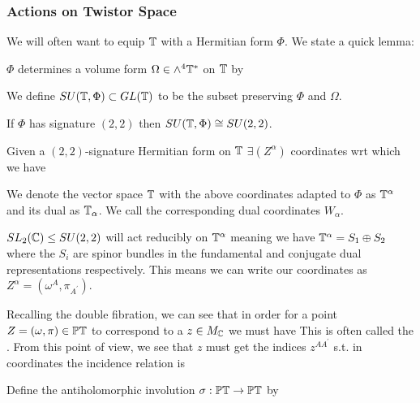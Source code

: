 \documentclass{article}
\begin{document}
\subsubsection{Actions on Twistor Space}
We will often want to equip $\mathbb{T}$ with a Hermitian form $\Phi$. We state a quick lemma:
\begin{lemma}
	$\Phi$ determines a volume form $\Omega \in \wedge^4 \mathbb{T}^\ast$ on $\mathbb{T}$ by 
	\eq{
\Omega = \image \Phi \wedge \image \Phi 
}
\end{lemma}
\begin{definition}
	We define $SU(\mathbb{T},\Phi) \subset GL(\mathbb{T})$ to be the subset preserving $\Phi$ and $\Omega$.  
\end{definition}
\begin{example}
	If $\Phi$ has signature $(2,2)$ then $SU(\mathbb{T},\Phi) \cong SU(2,2)$. 
\end{example}
Given a $(2,2)$-signature Hermitian form on $\mathbb{T}$ $\exists(Z^\alpha)$ coordinates wrt which we have 
\begin{notation}
	We denote the vector space $\mathbb{T}$ with the above coordinates adapted to $\Phi$ as $\mathbb{T}^\alpha$ and its dual as $\mathbb{T}_\alpha$. We call the corresponding dual coordinates $W_\alpha$. 
\end{notation}
$SL_2(\mathbb{C}) \leq SU(2,2)$ will act reducibly on $\mathbb{T}^\alpha$ meaning we have $\mathbb{T}^\alpha = S_1 \oplus S_2$ where the $S_i$ are spinor bundles in the fundamental and conjugate dual representations respectively. This means we can write our coordinates as $Z^\alpha = (\omega^A, \pi_{A^\prime})$. 

\begin{remark}
 Recalling the double fibration, we can see that in order for a point $Z = (\omega,\pi) \in \mathbb{PT}$ to correspond to a $z \in M_{\mathbb{C}}$ we must have 
This is often called the . From this point of view, we see that $z$ must get the indices $z^{AA^\prime}$ s.t. in coordinates the incidence relation is 
\end{remark}

\begin{definition}
	Define the antiholomorphic involution $\sigma: \mathbb{PT} \to \mathbb{PT}$ by 
\end{definition}
\end{document}
